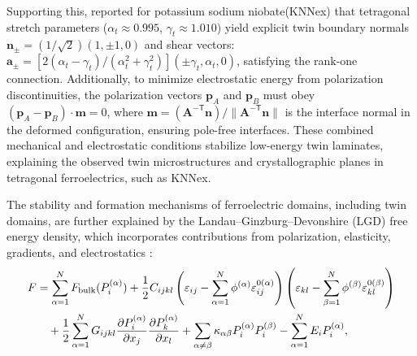 \documentclass[a4paper,fleqn]{cas-sc}
\begin{document}
\par Supporting this, \cite{grekas2025theory} reported for potassium sodium niobate(KNNex) that tetragonal stretch parameters  ($\alpha_t \approx 0.995$, $\gamma_t \approx 1.010$) yield explicit twin boundary normals $\mathbf{n}_\pm = (1/\sqrt{2})(1, \pm1, 0)$ and shear vectors: $\mathbf{a}_\pm = [2(\alpha_t - \gamma_t) / (\alpha_t^2 + \gamma_t^2)] (\pm\gamma_t, \alpha_t, 0)$, satisfying the rank-one connection. Additionally, to minimize electrostatic energy from polarization discontinuities, the polarization vectors $\mathbf{p}_A$ and $\mathbf{p}_B$ must obey $(\mathbf{p}_A - \mathbf{p}_B) \cdot \mathbf{m} = 0$, where $\mathbf{m} = (\mathbf{A}^{-\mathsf{T}}\mathbf{n}) / \|\mathbf{A}^{-\mathsf{T}}\mathbf{n}\|$ is the interface normal in the deformed configuration, ensuring pole-free interfaces. These combined mechanical and electrostatic conditions stabilize low-energy twin laminates, explaining the observed twin microstructures and crystallographic planes in tetragonal ferroelectrics, such as KNNex. 
\par The stability and formation mechanisms of ferroelectric domains, including twin domains, are further explained by the Landau–Ginzburg–Devonshire (LGD) free energy density, which incorporates contributions from polarization, elasticity, gradients, and electrostatics \cite{BHATTACHARYA2024116273}:
\begin{align} \label{lgd-batio3-ferroelectric}
    F &= \sum_{\alpha=1}^N F_{\text{bulk}}(P_i^{(\alpha)}) + \frac{1}{2} C_{ijkl} \left( \varepsilon_{ij} - \sum_{\alpha=1}^N \phi^{(\alpha)} \varepsilon_{ij}^{0(\alpha)} \right) \left( \varepsilon_{kl} - \sum_{\beta=1}^N \phi^{(\beta)} \varepsilon_{kl}^{0(\beta)} \right) \notag \\
    &\quad + \frac{1}{2} \sum_{\alpha=1}^N G_{ijkl} \frac{\partial P_i^{(\alpha)}}{\partial x_j} \frac{\partial P_k^{(\alpha)}}{\partial x_l} + \sum_{\alpha \neq \beta} \kappa_{\alpha\beta} P_i^{(\alpha)} P_i^{(\beta)} - \sum_{\alpha=1}^N E_i P_i^{(\alpha)},
\end{align}
\end{document}
